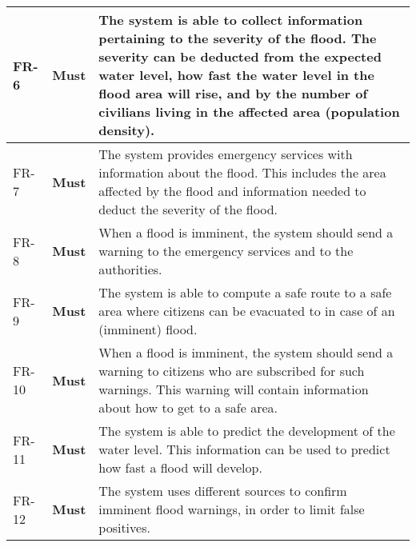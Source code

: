 \begin{longtable}{p{} p{} p{}}
    \hline {} \label{fr:6} FR-6 & 
      \textbf{Must} &
     The system is able to collect information pertaining to the severity of the flood. The severity can be deducted from the expected water level, how fast the water level in the flood area will rise, and by the number of civilians living in the affected area (population density). \\
    
    \hline {} \label{fr:7} FR-7 & 
      \textbf{Must} &
     The system provides emergency services with information about the flood. This includes the area affected by the flood and information needed to deduct the severity of the flood. \\
    
	\hline {} \label{fr:8} FR-8 & 
      \textbf{Must} &
      When a flood is imminent, the system should send a warning to the emergency services and to the authorities.\\
    
    \hline {} \label{fr:9} FR-9 & 
      \textbf{Must} &
      The system is able to compute a safe route to a safe area where citizens can be evacuated to in case of an (imminent) flood. \\ 

    \hline {} \label{fr:10} FR-10 & 
      \textbf{Must} &
      When a flood is imminent, the system should send a warning to citizens who are subscribed for such warnings. This warning will contain information about how to get to a safe area. \\
	
    \hline {} \label{fr:11} FR-11 & 
      \textbf{Must} &
      The system is able to predict the development of the water level. This information can be used to predict how fast a flood will develop. \\
	
    \hline {} \label{fr:12} FR-12 & 
      \textbf{Must} &
     The system uses different sources to confirm imminent flood warnings, in order to limit false positives. \\%
	

\end{longtable}
